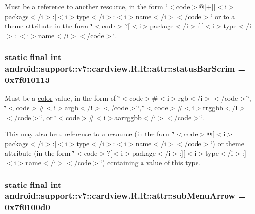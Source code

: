 Must be a reference to another resource, in the form \char`\"{}$<$code$>$@\mbox{[}+\mbox{]}\mbox{[}$<$i$>$package$<$/i$>$:\mbox{]}$<$i$>$type$<$/i$>$:$<$i$>$name$<$/i$>$$<$/code$>$\char`\"{} or to a theme attribute in the form \char`\"{}$<$code$>$?\mbox{[}$<$i$>$package$<$/i$>$:\mbox{]}\mbox{[}$<$i$>$type$<$/i$>$:\mbox{]}$<$i$>$name$<$/i$>$$<$/code$>$\char`\"{}. \hypertarget{classandroid_1_1support_1_1v7_1_1cardview_1_1_r_1_1attr_79c489d6be2bac805ec4314b98231d70}{
\subsubsection[{statusBarScrim}]{\setlength{\rightskip}{0pt plus 5cm}static final int android::support::v7::cardview.R.R::attr::statusBarScrim = 0x7f010113}}
\label{classandroid_1_1support_1_1v7_1_1cardview_1_1_r_1_1attr_79c489d6be2bac805ec4314b98231d70}


Must be a \hyperlink{classandroid_1_1support_1_1v7_1_1cardview_1_1_r_1_1color}{color} value, in the form of \char`\"{}$<$code$>$\#$<$i$>$rgb$<$/i$>$$<$/code$>$\char`\"{}, \char`\"{}$<$code$>$\#$<$i$>$argb$<$/i$>$$<$/code$>$\char`\"{}, \char`\"{}$<$code$>$\#$<$i$>$rrggbb$<$/i$>$$<$/code$>$\char`\"{}, or \char`\"{}$<$code$>$\#$<$i$>$aarrggbb$<$/i$>$$<$/code$>$\char`\"{}. 

This may also be a reference to a resource (in the form \char`\"{}$<$code$>$@\mbox{[}$<$i$>$package$<$/i$>$:\mbox{]}$<$i$>$type$<$/i$>$:$<$i$>$name$<$/i$>$$<$/code$>$\char`\"{}) or theme attribute (in the form \char`\"{}$<$code$>$?\mbox{[}$<$i$>$package$<$/i$>$:\mbox{]}\mbox{[}$<$i$>$type$<$/i$>$:\mbox{]}$<$i$>$name$<$/i$>$$<$/code$>$\char`\"{}) containing a value of this type. \hypertarget{classandroid_1_1support_1_1v7_1_1cardview_1_1_r_1_1attr_de575d7864d7ce11b203f8622fc9f5ef}{
\subsubsection[{subMenuArrow}]{\setlength{\rightskip}{0pt plus 5cm}static final int android::support::v7::cardview.R.R::attr::subMenuArrow = 0x7f0100d0}}
\label{classandroid_1_1support_1_1v7_1_1cardview_1_1_r_1_1attr_de575d7864d7ce11b203f8622fc9f5ef}


